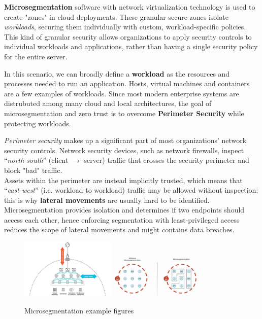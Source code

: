 \textbf{Microsegmentation} software with network virtualization technology is
used to create "zones" in cloud deployments.
These granular secure zones isolate \textit{workloads}, securing them individually with custom,
workload-specific policies.
This kind of granular security allows organizations to apply security controls to individual workloads and
applications, rather than having a single security policy for the entire server.

In this scenario, we can broadly define a \textbf{workload} as the resources and processes
needed to run an application. 
Hosts, virtual machines and containers are a few examples of workloads.
Since most modern enterprise systems are distrubuted among many cloud and local architectures, 
the goal of microsegmentation and zero trust is to overcome
\textbf{Perimeter Security} while protecting workloads.\nl

\textit{Perimeter security} makes up a significant part of most organizations’
network security controls.
Network security devices, such as network firewalls,
inspect “\textit{north-south}” (client $\rightarrow$ server) traffic that crosses the
security perimeter and block "bad" traffic.\\
Assets within the perimeter are instead implicitly trusted,
which means that “\textit{east-west}” (i.e. workload to workload) traffic may be allowed without inspection;
this is why \textbf{lateral movements} are usually hard to be identified.\\
Microsegmentation provides isolation and determines if two endpoints should access each other, hence
enforcing segmentation with least-privileged access reduces the scope of
lateral movements and might contains data breaches.
\begin{figure}[htbp]
   \centering
   \includegraphics[width=0.4\textwidth]{images/microsegmentation_1.png}
   \includegraphics[width=0.4\textwidth]{images/microsegmentation_2.png}
   \caption{Microsegmentation example figures}
   \label{fig:microsegmentation}
\end{figure}

